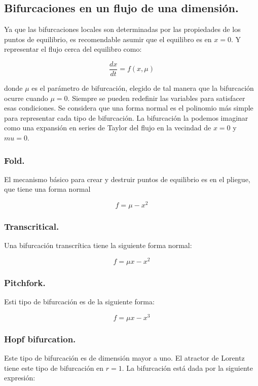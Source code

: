 \documentclass[prodmode,acmtap]{acmlarge}
\begin{document}
\subsection{Bifurcaciones en un flujo de una dimensión.}
Ya que las bifurcaciones locales son determinadas por las propiedades de los puntos de equilibrio, es recomendable asumir que el equilibro es en $x=0$. Y representar el flujo cerca del equilibro como:

\begin{equation}
\frac{dx}{dt}= f(x, \mu)
\end{equation}


donde $\mu$ es el parámetro de bifurcación, elegido de tal manera que la bifurcación ocurre cuando $\mu =0$. Siempre se pueden  redefinir las variables para satisfacer esas condiciones. Se considera que una forma normal es el polinomio más simple para representar cada tipo de bifurcación. La bifurcación la podemos imaginar como una expansión en series de Taylor del flujo en la vecindad de $x=0$ y $mu=0$. 


\subsubsection{Fold.}
El mecanismo básico para crear y destruir puntos de equilibrio es en el pliegue, que tiene una forma normal

\begin{equation}
f= \mu - x^{2}
\end{equation}

\subsubsection{Transcritical.}
Una bifurcación transcrítica tiene la siguiente forma normal:

\begin{equation}
f= \mu x- x^{2}
\end{equation}

\subsubsection{Pitchfork.}
Esti tipo de bifurcación es de la siguiente forma:

\begin{equation}
f= \mu x - x^{3}
\end{equation}

\subsubsection{Hopf bifurcation.}
Este tipo de bifurcación es de dimensión mayor a uno. El atractor de Lorentz  tiene este tipo de bifurcación en $r=1$. La bifurcación está dada por la siguiente expresión:
\end{document}
